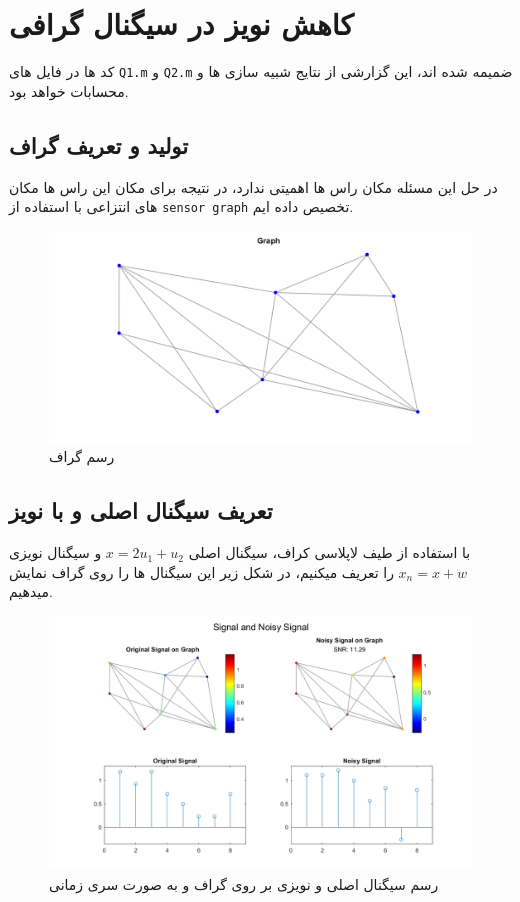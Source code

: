 \section{کاهش نویز در سیگنال گرافی}

کد ها در فایل های \texttt{Q1.m} و \texttt{Q2.m} ضمیمه شده اند، این گزارشی از نتایج شبیه سازی ها و
محسابات خواهد بود.

\subsection{تولید و تعریف گراف}

در حل این مسئله مکان راس ها اهمیتی ندارد، در نتیجه برای مکان این راس ها مکان های انتزاعی با استفاده از \texttt{sensor graph}
تخصیص داده ایم.
\begin{figure}[h!]
	\centering
	\includegraphics*[width=0.55\linewidth]{../results/Q1/graph.png}
	\vspace*{-3em}
	\caption{رسم گراف}
\end{figure}

\subsection{تعریف سیگنال اصلی و با نویز}

با استفاده از طیف لاپلاسی کراف، سیگنال اصلی $x=2u_1+u_2$ و سیگنال نویزی $x_n=x+w$ را تعریف میکنیم، در شکل زیر این
سیگنال ها را روی گراف نمایش میدهیم.

\begin{figure}[h!]
	\centering
	\includegraphics*[width=0.9\linewidth]{../results/Q1/sig_noisysig.png}
	\vspace*{-2em}
	\caption{رسم سیگنال اصلی و نویزی بر روی گراف و به صورت سری زمانی}
\end{figure}

